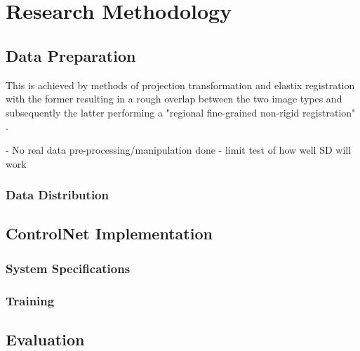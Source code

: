 
\chapter{Research Methodology} %



\ifpdf
    \graphicspath{{4_ResearchMethodology/figures/PNG/}{4_ResearchMethodology/figures/PDF/}{4_ResearchMethodology/figures/}}
\else
    \graphicspath{{4_ResearchMethodology/figures/EPS/}{4_ResearchMethodology/figures/}}
\fi



\section{Data Preparation}

This is achieved by methods of projection transformation and elastix registration \parencite{Klein2010Elastix:Registration}  with the former resulting in a rough overlap between the two image types and subsequently the latter performing a "regional fine-grained non-rigid registration" \parencite[p. 5]{Liu2022BCI:Pix2pix}. 

- No real data pre-processing/manipulation done - limit test of how well SD will work

\subsection{Data Distribution}

\section{ControlNet Implementation}

\subsection{System Specifications}

\subsection{Training}

\section{Evaluation}



